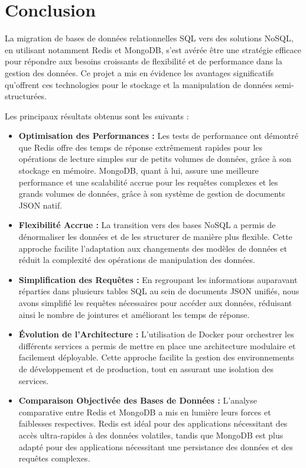 \chapter{Conclusion}

La migration de bases de données relationnelles SQL vers des solutions NoSQL, en utilisant notamment Redis et MongoDB, s'est avérée être une stratégie efficace pour répondre aux besoins croissants de flexibilité et de performance dans la gestion des données. Ce projet a mis en évidence les avantages significatifs qu'offrent ces technologies pour le stockage et la manipulation de données semi-structurées.

Les principaux résultats obtenus sont les suivants :

\begin{itemize}
  \item \textbf{Optimisation des Performances :} Les tests de performance ont démontré que Redis offre des temps de réponse extrêmement rapides pour les opérations de lecture simples sur de petits volumes de données, grâce à son stockage en mémoire. MongoDB, quant à lui, assure une meilleure performance et une scalabilité accrue pour les requêtes complexes et les grands volumes de données, grâce à son système de gestion de documents JSON natif.

  \item \textbf{Flexibilité Accrue :} La transition vers des bases NoSQL a permis de dénormaliser les données et de les structurer de manière plus flexible. Cette approche facilite l'adaptation aux changements des modèles de données et réduit la complexité des opérations de manipulation des données.

  \item \textbf{Simplification des Requêtes :} En regroupant les informations auparavant réparties dans plusieurs tables SQL au sein de documents JSON unifiés, nous avons simplifié les requêtes nécessaires pour accéder aux données, réduisant ainsi le nombre de jointures et améliorant les temps de réponse.

  \item \textbf{Évolution de l'Architecture :} L'utilisation de Docker pour orchestrer les différents services a permis de mettre en place une architecture modulaire et facilement déployable. Cette approche facilite la gestion des environnements de développement et de production, tout en assurant une isolation des services.

  \item \textbf{Comparaison Objectivée des Bases de Données :} L'analyse comparative entre Redis et MongoDB a mis en lumière leurs forces et faiblesses respectives. Redis est idéal pour des applications nécessitant des accès ultra-rapides à des données volatiles, tandis que MongoDB est plus adapté pour des applications nécessitant une persistance des données et des requêtes complexes.

\end{itemize}

